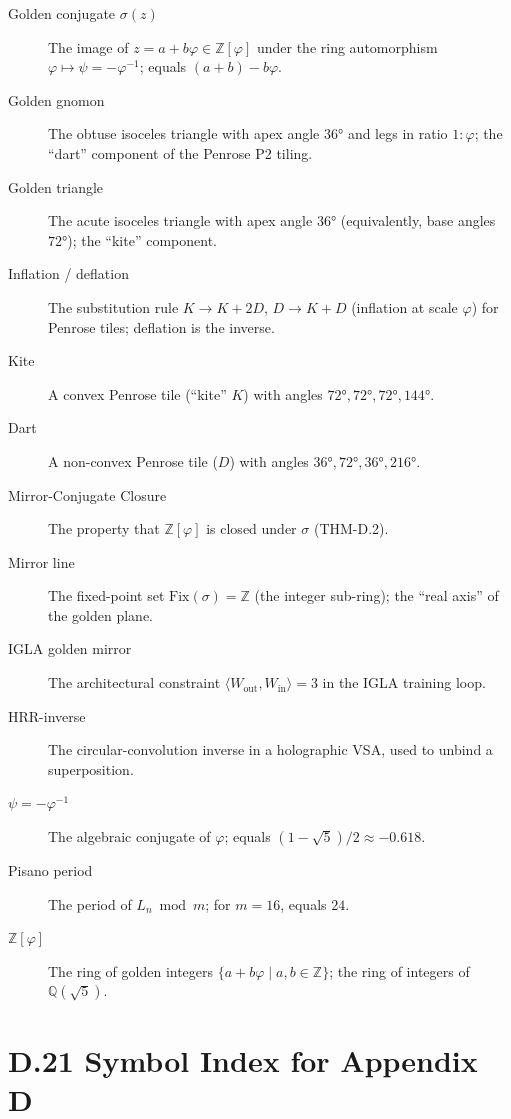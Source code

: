 \begin{description}
  \item[Golden conjugate $\sigma(z)$] The image of $z = a+b\varphi\in\mathbb{Z}[\varphi]$
    under the ring automorphism $\varphi\mapsto\psi = -\varphi^{-1}$; equals
    $(a+b)-b\varphi$.
  \item[Golden gnomon] The obtuse isoceles triangle with apex angle $36°$ and
    legs in ratio $1:\varphi$; the ``dart'' component of the Penrose P2 tiling.
  \item[Golden triangle] The acute isoceles triangle with apex angle $36°$
    (equivalently, base angles $72°$); the ``kite'' component.
  \item[Inflation / deflation] The substitution rule $K\to K+2D$, $D\to K+D$
    (inflation at scale $\varphi$) for Penrose tiles; deflation is the inverse.
  \item[Kite] A convex Penrose tile (``kite'' $K$) with angles $72°,72°,72°,144°$.
  \item[Dart] A non-convex Penrose tile ($D$) with angles $36°,72°,36°,216°$.
  \item[Mirror-Conjugate Closure] The property that $\mathbb{Z}[\varphi]$ is
    closed under $\sigma$ (THM-D.2).
  \item[Mirror line] The fixed-point set $\mathrm{Fix}(\sigma) = \mathbb{Z}$
    (the integer sub-ring); the ``real axis'' of the golden plane.
  \item[IGLA golden mirror] The architectural constraint
    $\langle W_\mathrm{out}, W_\mathrm{in}\rangle = 3$ in the IGLA training loop.
  \item[HRR-inverse] The circular-convolution inverse in a holographic VSA,
    used to unbind a superposition.
  \item[$\psi = -\varphi^{-1}$] The algebraic conjugate of $\varphi$; equals
    $(1-\sqrt5)/2 \approx -0.618$.
  \item[Pisano period] The period of $L_n \bmod m$; for $m=16$, equals $24$.
  \item[{$\mathbb{Z}[\varphi]$}] The ring of golden integers $\{a+b\varphi\mid a,b\in\mathbb{Z}\}$;
    the ring of integers of $\mathbb{Q}(\sqrt5)$.
\end{description}

\section*{D.21  Symbol Index for Appendix D}


